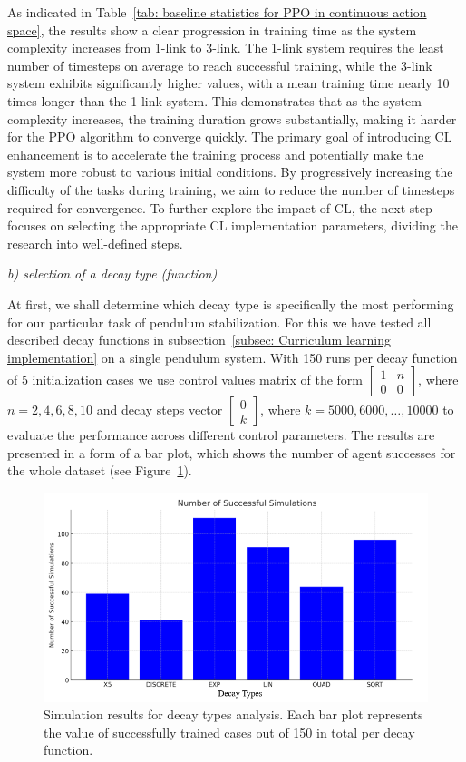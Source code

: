 As indicated in Table~\ref{tab: baseline statistics for PPO in continuous action space}, the results show a clear progression in training time as the system complexity increases from 1-link to 3-link. The 1-link system requires the least number of timesteps on average to reach successful training, while the 3-link system exhibits significantly higher values, with a mean training time nearly 10 times longer than the 1-link system. This demonstrates that as the system complexity increases, the training duration grows substantially, making it harder for the PPO algorithm to converge quickly.
The primary goal of introducing CL enhancement is to accelerate the training process and potentially make the system more robust to various initial conditions. By progressively increasing the difficulty of the tasks during training, we aim to reduce the number of timesteps required for convergence. To further explore the impact of CL, the next step focuses on selecting the appropriate CL implementation parameters, dividing the research into well-defined steps.

\textit{b) selection of a decay type (function)} 

At first, we shall determine which decay type is specifically the most performing for our particular task of pendulum stabilization. For this we have tested all described decay functions in subsection~\ref{subsec: Curriculum learning implementation} on a single pendulum system. With 150 runs per decay function of 5 initialization cases we use control values matrix of the form 
\(\begin{bmatrix} 1 & n \\ 0 & 0 \end{bmatrix}\), where \(n = 2, 4, 6, 8, 10\) and decay steps vector \(\begin{bmatrix} 0 \\ k \end{bmatrix}\), where \(k = 5000, 6000, \ldots, 10000\) to evaluate the performance across different control parameters. The results are presented in a form of a bar plot, which shows the number of agent successes for the whole dataset (see Figure~\ref{fig: decay types comparison}).  

\begin{figure}[h]
	\centering
	\includegraphics[width=12cm]{Figures/decay_types_results_comparison.png}
	\caption{Simulation results for decay types analysis. Each bar plot represents the value of successfully trained cases out of 150 in total per decay function.}
	\label{fig: decay types comparison}
\end{figure}

